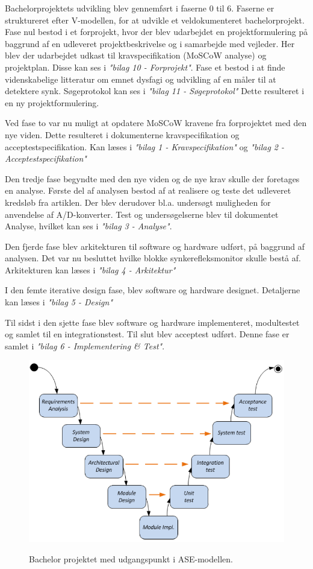Bachelorprojektets udvikling blev gennemført i faserne 0 til 6. Faserne er struktureret efter V-modellen\cite{IngeniorhojskolenAarhusUniversiteta}, for at udvikle et veldokumenteret bachelorprojekt. Fase nul bestod i et forprojekt, hvor der blev udarbejdet en projektformulering på baggrund af en udleveret projektbeskrivelse og i samarbejde med vejleder. Her blev der udarbejdet udkast til kravspecifikation (MoSCoW analyse) og projektplan. Disse kan ses i \textit{"bilag 10 - Forprojekt"}. Fase et bestod i at finde videnskabelige litteratur om emnet dysfagi og udvikling af en måler til at detektere synk. Søgeprotokol kan ses i \textit{"bilag 11 - Søgeprotokol"} Dette resulteret i en ny projektformulering.

Ved fase to var nu muligt at opdatere MoSCoW kravene fra forprojektet med den nye viden. Dette resulteret i dokumenterne kravspecifikation og acceptestspecifikation. Kan læses i \textit{"bilag 1 - Kravspecifikation"} og \textit{"bilag 2 - Acceptestspecifikation"}

Den tredje fase begyndte med den nye viden og de nye krav skulle der foretages en analyse. Første del af analysen bestod af at realisere og teste det udleveret kredsløb fra artiklen. Der blev derudover bl.a. undersøgt muligheden for anvendelse af A/D-konverter. Test og undersøgelserne blev til dokumentet Analyse, hvilket kan ses i \textit{"bilag 3 - Analyse"}.

Den fjerde fase blev arkitekturen til software og hardware udført, på baggrund af analysen. Det var nu besluttet hvilke blokke synkerefleksmonitor skulle bestå af. Arkitekturen kan læses i \textit{"bilag 4 - Arkitektur"}

I den femte iterative design fase, blev software og hardware designet. Detaljerne kan læses i \textit{"bilag 5 - Design"}

Til sidst i den sjette fase blev software og hardware implementeret, modultestet og samlet til en integrationstest. Til slut blev acceptest udført. Denne fase er samlet i \textit{"bilag 6 - Implementering \& Test"}.



\begin{figure}[H] 
\centering
{\includegraphics[width=12cm]
{Figure/vmodel}}
\caption{Bachelor projektet med udgangspunkt i ASE-modellen.}
\label{vmodel}
\end{figure}



